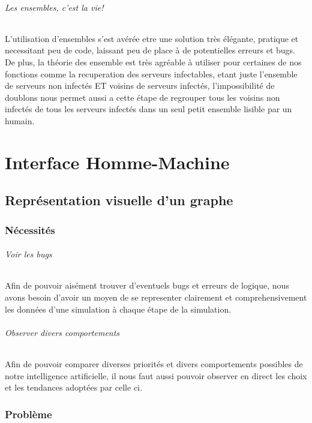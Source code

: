 \documentclass{scrreprt}
\begin{document}
    \paragraph{Les ensembles, c'est la vie!}
    L'utilisation d'ensembles s'est avérée etre une solution très élégante,
    pratique et necessitant peu de code, laissant peu de place à de
    potentielles erreurs et bugs.
    De plus, la théorie des ensemble est très agréable à utiliser pour
    certaines de nos fonctions comme la recuperation des serveurs
    infectables, etant juste l'ensemble de serveurs non infectés ET voisins
    de serveurs infectés, l'impossibilité de doublons nous permet aussi a
    cette étape de regrouper tous les voisins non infectés de tous les serveurs
    infectés dans un seul petit ensemble lisible par un humain.



    \part{Interface Homme-Machine}
    \chapter{Représentation visuelle d'un graphe}
    \section{Nécessités}

    \paragraph{Voir les bugs}
    Afin de pouvoir aisément trouver d'eventuels bugs et erreurs de logique,
    nous avons besoin d'avoir un moyen de se representer clairement et
    comprehensivement les données d'une simulation à chaque étape de la
    simulation.


    \paragraph{Observer divers comportements}
    Afin de pouvoir comparer diverses priorités et divers comportements
    possibles de notre intelligence artificielle, il nous faut aussi pouvoir
    observer en direct les choix et les tendances adoptées par celle ci.

    \section{Problème}
\end{document}
